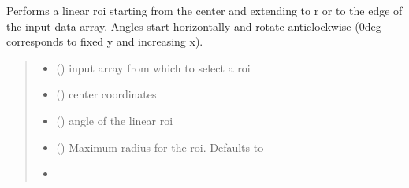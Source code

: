 \documentclass[letterpaper,10pt,english]{sphinxmanual}
\begin{document}
\begin{fulllineitems}
\label{\detokenize{micropolarray.processing:micropolarray.processing.linear_roi.linear_roi_from_polar}}
\pysigstartsignatures
{}
\pysigstopsignatures
\sphinxAtStartPar
Performs a linear roi starting from the center and extending
to r or to the edge of the input data array.
Angles start horizontally and rotate anti\sphinxhyphen{}clockwise (0deg
corresponds to fixed y and increasing x).
\begin{quote}\begin{description}
\begin{itemize}
\item {} 
\sphinxAtStartPar
{} () \textendash{} input array from which to select a roi

\item {} 
\sphinxAtStartPar
{} () \textendash{} center coordinates

\item {} 
\sphinxAtStartPar
{} () \textendash{} angle of the linear roi

\item {} 
\sphinxAtStartPar
{} (\sphinxstyleliteralemphasis{\sphinxupquote{, }}) \textendash{} Maximum radius for the roi. Defaults to

\item {} 
\sphinxAtStartPar
{}

\end{itemize}


\end{description}
\end{quote}
\end{fulllineitems}
\end{document}
